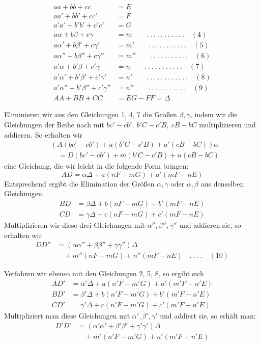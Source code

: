 %
\[
\begin{aligned}
aa+bb+cc&=E\\
aa'+bb'+cc'&=F\\
a'a'+b'b'+c'c'&=G\\
a\alpha+b\beta+c\gamma&=m\qquad .\ .\ .\ .\ .\ .\ .\ .\ .\ .\ .\quad(4)\\
a\alpha'+b\beta'+c\gamma'&=m'\qquad .\ .\ .\ .\ .\ .\ .\ .\ .\ .\ .\quad(5)\\
a\alpha''+b\beta''+c\gamma''&=m''\qquad .\ .\ .\ .\ .\ .\ .\ .\ .\ .\ .\quad(6)\\
a'\alpha+b'\beta+c'\gamma&=n\qquad .\ .\ .\ .\ .\ .\ .\ .\ .\ .\ .\quad(7)\\
a'\alpha'+b'\beta'+c'\gamma'&=n'\qquad .\ .\ .\ .\ .\ .\ .\ .\ .\ .\ .\ .\quad(8)\\
a'\alpha''+b'\beta''+c'\gamma''&=n''\qquad .\ .\ .\ .\ .\ .\ .\ .\ .\ .\ .\quad(9)\\
AA+BB+CC&=EG-FF=\Delta
\end{aligned}
\]
\par\indent Eliminieren wir aus den Gleichungen 1, 4, 7 die Größen \(\beta,\gamma\), indem wir die Gleichungen der Reihe nach mit \(bc'-cb',\ b'C-c'B,\ cB-bC\) multiplizieren und addieren. So erhalten wir
\[
\begin{aligned}
&(A(bc'-cb')+a(b'C-c'B)+a'(cB-bC))\alpha\\
&\quad=D(bc'-cb')+m(b'C-c'B)+n(cB-bC)
\end{aligned}
\]
eine Gleichung, die wir leicht in die folgende Form bringen:
\[
AD=\alpha\Delta+a(nF-mG)+a'(mF-nE)
\]
Entsprechend ergibt die Elimination der Größen \(\alpha,\gamma\) oder \(\alpha,\beta\) aus denselben Gleichungen
\[
\begin{aligned}
BD&=\beta\Delta+b(nF-mG)+b'(mF-nE)\\
CD&=\gamma\Delta+c(nF-mG)+c'(mF-nE)
\end{aligned}
\]
Multiplizieren wir diese drei Gleichungen mit \(\alpha'',\beta'',\gamma''\) und addieren sie, so erhalten wir
\[
\begin{aligned}
DD''&=(\alpha\alpha''+\beta\beta''+\gamma\gamma'')\Delta\\
&\quad+m''(nF-mG)+n''(mF-nE)\quad .\ .\ .\ .\quad(10)
\end{aligned}
\]
\par\indent Verfahren wir ebenso mit den Gleichungen 2, 5, 8, so ergibt sich
\[
\begin{aligned}
AD'&=\alpha'\Delta+a(n'F-m'G)+a'(m'F-n'E)\\
BD'&=\beta'\Delta+b(n'F-m'G)+b'(m'F-n'E)\\
CD'&=\gamma'\Delta+c(n'F-m'G)+c'(m'F-n'E)
\end{aligned}
\]
Multipliziert man diese Gleichungen mit \(\alpha',\beta',\gamma'\) und addiert sie, so erhält man:
\[
\begin{aligned}
D'D'&=(\alpha'\alpha'+\beta'\beta'+\gamma'\gamma')\Delta\\
&\quad+m'(n'F-m'G)+n'(m'F-n'E)
\end{aligned}
\]
